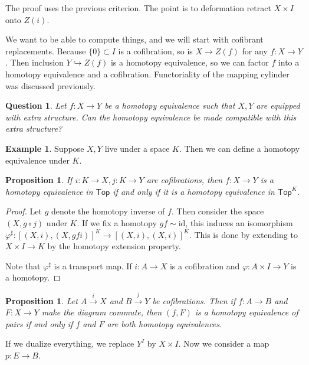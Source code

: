\documentclass[leqno, openany]{memoir}
\newtheorem{prop}[thm]{Proposition}
\newtheorem{quest}[thm]{Question}
\theoremstyle{definition}
\newtheorem{exm}[thm]{Example}
\theoremstyle{remark}
\theoremstyle{plain}
\theoremstyle{definition}
\theoremstyle{remark}
\newcommand{\mr}[1]{\mathrm{#1}}
\newcommand{\ms}[1]{\mathsf{#1}}
\begin{document}
The proof uses the previous criterion. The point is to deformation retract $X \times I$ onto $Z(i)$.

We want to be able to compute things, and we will start with cofibrant replacements. Because $\{ 0 \} \subset I$ is a cofibration, so is $X \to Z(f)$ for any $f \colon X \to Y$. Then inclusion $Y \hookrightarrow Z(f)$ is a homotopy equivalence, so we can factor $f$ into a homotopy equivalence and a cofibration. Functoriality of the mapping cylinder was discussed previously.

\begin{quest}
    Let $f \colon X \to Y$ be a homotopy equivalence such that $X,Y$ are equipped with extra structure. Can the homotopy equivalence be made compatible with this extra structure?
\end{quest}

\begin{exm}
    Suppose $X,Y$ live under a space $K$. Then we can define a homotopy equivalence under $K$.
\end{exm}

\begin{prop}
    If $i \colon K \to X,j \colon K \to Y$ are cofibrations, then $f \colon X \to Y$ is a homotopy equivalence in $\ms{Top}$ if and only if it is a homotopy equivalence in $\ms{Top}^K$.
\end{prop}

\begin{proof}
    Let $g$ denote the homotopy inverse of $f$. Then consider the space $(X, g \circ j)$ under $K$. If we fix a homotopy $gf \sim \mr{id}$, this induces an isomorphism $\varphi^{\sharp} \colon [(X,i), (X,gfi)]^K \to [(X,i), (X,i)]^K$. This is done by extending to $X \times I \to K$ by the homotopy extension property.

Note that $\varphi^{\sharp}$ is a transport map. If $i \colon A \to X$ is a cofibration and $\varphi \colon A \times I \to Y$ is a homotopy. 
\end{proof}

\begin{prop}
    Let $A \xrightarrow{i} X$ and $B \xrightarrow{j} Y$ be cofibrations. Then if $f \colon A \to B$ and $F \colon X \to Y$ make the diagram commute, then $(f, F)$ is a homotopy equivalence of pairs if and only if $f$ and $F$ are both homotopy equivalences.
\end{prop}

If we dualize everything, we replace $Y^I$ by $X \times I$. Now we consider a map $p \colon E \to B$.
\end{document}
